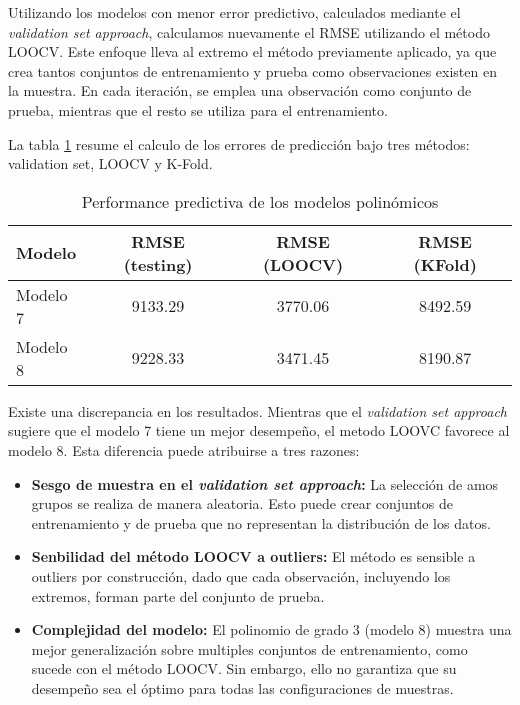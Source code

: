 \documentclass[11pt,oneside]{article}
\begin{document}
    Utilizando los modelos con menor error predictivo, calculados mediante el \textit{validation set approach}, calculamos nuevamente el RMSE utilizando el método LOOCV. Este enfoque lleva al extremo el método previamente aplicado, ya que crea tantos conjuntos de entrenamiento y prueba como observaciones existen en la muestra. En cada iteración, se emplea una observación como conjunto de prueba, mientras que el resto se utiliza para el entrenamiento.




La tabla \ref{tab:comparacion} resume el calculo de los errores de predicción bajo tres métodos: validation set, LOOCV y K-Fold. 

	\begin{table}[H]
		\centering
        \caption{Performance predictiva de los modelos polinómicos}
		\begin{tabular}{lccc}
            \hline
            \textbf{Modelo} & \textbf{RMSE (testing)} & \textbf{RMSE (LOOCV)} & \textbf{RMSE (KFold)} \\ \hline
            Modelo 7        & 9133.29                & 3770.06               & 8492.59               \\
            Modelo 8        & 9228.33                & 3471.45               & 8190.87               \\ \hline
    \end{tabular}
		\label{tab:comparacion}
	\end{table}


Existe una discrepancia en los resultados. Mientras que el \textit{validation set approach} sugiere que el modelo 7 tiene un mejor desempeño, el metodo LOOVC favorece al modelo 8. Esta diferencia puede atribuirse a tres razones:
\begin{itemize}
    \item \textbf{Sesgo de muestra en el \textit{validation set approach}:} La selección de amos grupos se realiza de manera aleatoria. Esto puede crear conjuntos de entrenamiento y de prueba que no representan la distribución de los datos. 
    \item \textbf{Senbilidad del método LOOCV a outliers:} El método es sensible a outliers por construcción, dado que cada observación, incluyendo los extremos, forman parte del conjunto de prueba.
    \item \textbf{Complejidad del modelo:} El polinomio de grado 3 (modelo 8) muestra una mejor generalización sobre multiples conjuntos de entrenamiento, como sucede con el método LOOCV. Sin embargo, ello no garantiza que su desempeño sea el óptimo para todas las configuraciones de muestras.
\end{itemize}
\end{document}
